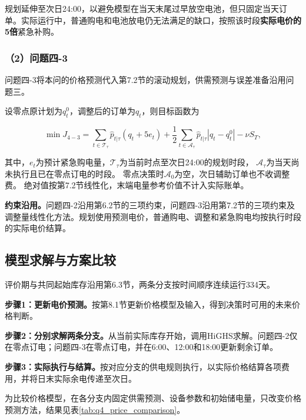 规划延伸至次日24:00，以避免模型在当天末尾过早放空电池，但只固定当天订单。实际运行中，普通购电和电池放电仍无法满足的缺口，按照该时段\textbf{实际电价的5倍}紧急补购。

\subsubsection*{（2）问题四-3}

问题四-3将本问的价格预测代入第7.2节的滚动规划，供需预测与误差准备沿用问题三。

设零点原计划为$q_t^0$，调整后的订单为$q_t$，则目标函数为

\begin{equation}
\min J_{4-3}
=
\sum_{t\in \mathcal T_{\tau}}
\hat{p}_{t|\tau}
\left(q_t+5e_t\right)
+
\frac{1}{2}
\sum_{t\in \mathcal A_{\tau}}
\hat{p}_{t|\tau}
\left|q_t-q_t^0\right|
-
\nu S_T,
\end{equation}

其中，$e_t$为预计紧急购电量，$\mathcal T_{\tau}$为当前时点至次日24:00的规划时段，
$\mathcal A_{\tau}$为当天尚未执行且已在零点订电的时段。
零点决策时$\mathcal A_0$为空，次日辅助订单也不收调整费。
绝对值按第7.2节线性化，末端电量参考价值不计入实际账单。

\noindent\textbf{约束沿用。}问题四-2沿用第6.2节的三项约束，问题四-3沿用第7.2节的三项约束及调整量线性化方法。规划使用预测电价，普通购电、调整和紧急购电均按执行时段的实际电价结算。

\subsection{模型求解与方案比较}

评价期与共同起始库存沿用第6.3节，两条分支按时间顺序连续运行334天。

\noindent\textbf{步骤1：更新电价预测。}按第8.1节更新价格模型及输入，得到决策时可用的未来价格判断。

\noindent\textbf{步骤2：分别求解两条分支。}从当前实际库存开始，调用HiGHS求解。问题四-2仅在零点订电；问题四-3在零点订电，并在6:00、12:00和18:00更新剩余订单。

\noindent\textbf{步骤3：实际执行与结算。}按对应分支的供电规则执行，以实际价格结算各项费用，并将日末实际余电传递至次日。

为比较价格模型，在各分支内固定供需预测、设备参数和初始储电量，只改变价格预测方法，结果见表\ref{tab:q4_price_comparison}。

